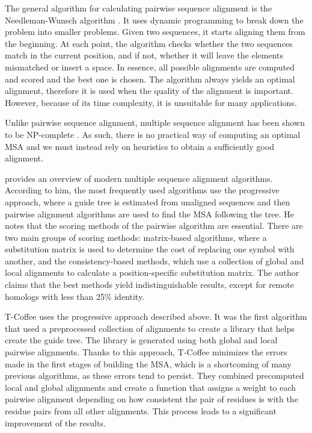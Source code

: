The general algorithm for calculating pairwise sequence alignment is the Nee\-dle\-man-Wunsch algorithm \citep{needleman}. It uses dynamic programming
to break down the problem into smaller problems. Given two sequences, it starts aligning them from the beginning. At each point, the algorithm checks
whether the two sequences match in the current position, and if not, whether it will leave the elements mismatched or insert a space. In essence,
all possible alignments are computed and scored and the best one is chosen. The algorithm always yields an optimal alignment, therefore it is
used when the quality of the alignment is important. However, because of its time complexity, it is unsuitable for many applications.

Unlike pairwise sequence alignment, multiple sequence alignment has been shown to be NP-complete \citep{msa_complexity}. As such, there is no practical
way of computing an optimal MSA and we must instead rely on heuristics to obtain a sufficiently good alignment.

\cite{msa_overview} provides an overview of modern multiple sequence alignment algorithms. According to him, the most frequently used algorithms use
the progressive approach, where a guide tree is estimated from unaligned sequences and then pairwise alignment algorithms are used to find
the MSA following the tree. He notes that the scoring methods of the pairwise algorithm are essential. There are two main groups of scoring methods:
matrix-based algorithms, where a substitution matrix is used to determine the cost of replacing one symbol with another, and the consistency-based
methods, which use a collection of global and local alignments to calculate a position-specific substitution matrix. The author claims that
the best methods yield indistinguishable results, except for remote homologs with less than 25\% identity.

T-Coffee \citep{t_coffee} uses the progressive approach described above. It was the first algorithm that used a preprocessed collection of 
alignments to create a library that helps create the guide tree. The library is generated using both global and local pairwise alignments.
Thanks to this approach, T-Coffee minimizes the errors made in the first stages of building the MSA, which is a shortcoming of many previous
algorithms, as these errors tend to persist. They combined precomputed local and global alignments and create a function that assigns a weight to
each pairwise alignment depending on how consistent the pair of residues is with the residue pairs from all other alignments. This process
leads to a significant improvement of the results.

